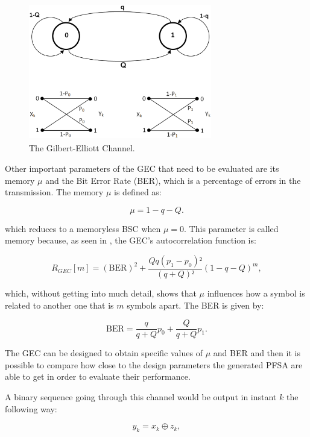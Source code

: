 {\begin{figure}
\centering
\includegraphics[width=8cm, height=6cm]{Figuras/figgec.eps}
\caption{\label{fig:gec} The Gilbert-Elliott Channel.}
\end{figure}

Other important parameters of the GEC that need to be evaluated are its memory $\mu$ and the Bit Error Rate (BER), which is a percentage of errors in the transmission. The memory $\mu$ is defined as:

\begin{equation}
\mu = 1 - q - Q. \label{eq:mumemory}
\end{equation}

\noindent which reduces to a memoryless BSC when $\mu = 0$. This parameter is called memory because, as seen in \cite{mushkin.89}, the GEC's autocorrelation function is:

\begin{equation}
R_{GEC}[m] = (\text{BER})^2 +\frac{Qq(p_1-p_0)²}{(q+Q)²}(1-q-Q)^m, \label{eq:rgec}
\end{equation}

\noindent which, without getting into much detail, shows that $\mu$ influences how a symbol is related to another one that is $m$ symbols apart. The BER is given by:

\begin{equation}
\text{BER} = \frac{q}{q+Q}p_0 + \frac{Q}{q+Q}p_1. \label{eq:gecber}
\end{equation}

The GEC can be designed to obtain specific values of $\mu$ and BER and then it is possible to compare how close to the design parameters the generated PFSA are able to get in order to evaluate their performance.

A binary sequence going through this channel would be output in instant $k$ the following way:

\begin{equation}
y_k = x_k\oplus z_k, \label{eq:binarychannel}
\end{equation}


}

